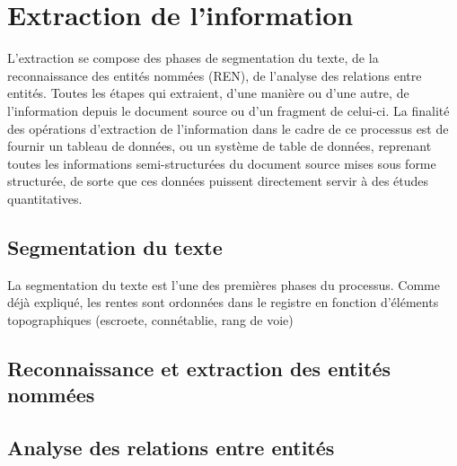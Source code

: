 \section{Extraction de l'information}
L'extraction se compose des phases de segmentation du texte, de la reconnaissance des entités nommées (REN), de l'analyse des relations entre entités. Toutes les étapes qui extraient, d'une manière ou d'une autre, de l'information depuis le document source ou d'un fragment de celui-ci. 
La finalité des opérations d'extraction de l'information dans le cadre de ce processus est de fournir un tableau de données, ou un système de table de données, reprenant toutes les informations semi-structurées du document source mises sous forme structurée, de sorte que ces données puissent directement servir à des études quantitatives.
\subsection{Segmentation du texte}
La segmentation du texte est l'une des premières phases du processus. Comme déjà expliqué, les rentes sont ordonnées dans le registre en fonction d'éléments topographiques (escroete, connétablie, rang de voie)

\subsection{Reconnaissance et extraction des entités nommées}

\subsection{Analyse des relations entre entités}